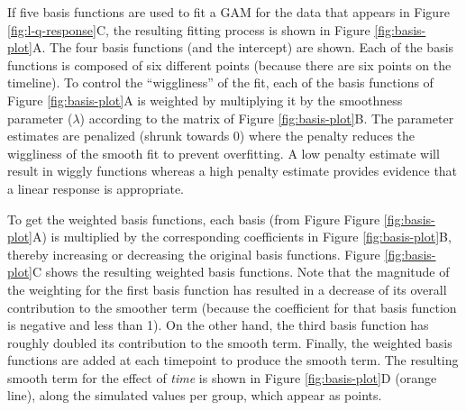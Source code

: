 \documentclass[
]{article}
\begin{document}
If five basis functions are used to fit a GAM for the data that appears in Figure \ref{fig:l-q-response}C, the resulting fitting process is shown in Figure \ref{fig:basis-plot}A. The four basis functions (and the intercept) are shown. Each of the basis functions is composed of six different points (because there are six points on the timeline). To control the ``wiggliness'' of the fit, each of the basis functions of Figure \ref{fig:basis-plot}A is weighted by multiplying it by the smoothness parameter (\(\lambda\)) according to the matrix of Figure \ref{fig:basis-plot}B. The parameter estimates are penalized (shrunk towards 0) where the penalty reduces the wiggliness of the smooth fit to prevent overfitting. A low penalty estimate will result in wiggly functions whereas a high penalty estimate provides evidence that a linear response is appropriate.

To get the weighted basis functions, each basis (from Figure Figure \ref{fig:basis-plot}A) is multiplied by the corresponding coefficients in Figure \ref{fig:basis-plot}B, thereby increasing or decreasing the original basis functions. Figure \ref{fig:basis-plot}C shows the resulting weighted basis functions. Note that the magnitude of the weighting for the first basis function has resulted in a decrease of its overall contribution to the smoother term (because the coefficient for that basis function is negative and less than 1). On the other hand, the third basis function has roughly doubled its contribution to the smooth term. Finally, the weighted basis functions are added at each timepoint to produce the smooth term. The resulting smooth term for the effect of \emph{time} is shown in Figure \ref{fig:basis-plot}D (orange line), along the simulated values per group, which appear as points.
\end{document}
